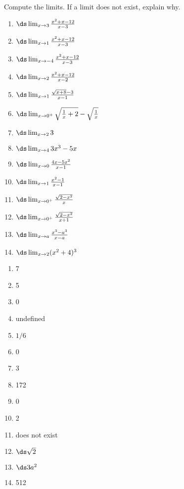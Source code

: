 \begin{enumialphparenastyle}

\begin{ex}
Compute the limits. If a limit does not exist, explain why.
\begin{multicols}{2}
\begin{enumerate}
	\item	$\ds \lim_{x\to 3}{x^2+x-12\over x-3}$
	\item	$\ds \lim_{x\to 1}{x^2+x-12\over x-3}$
	\item	$\ds \lim_{x\to -4}{x^2+x-12\over x-3}$
	\item	$\ds \lim_{x\to 2} {x^2+x-12\over x-2}$
	\item	$\ds \lim_{x\to 1} {\sqrt{x+8}-3\over x-1}$
	\item	$\ds \lim_{x\to 0^+} \sqrt{{1\over x}+2} - \sqrt{1\over x}$
	\item	$\ds\lim _{x\to 2} 3$
	\item	$\ds\lim _{x\to 4 } 3x^3 - 5x $
	\item	$\ds \lim _{x\to 0 } {4x - 5x^2\over x-1}$
	\item	$\ds\lim _{x\to 1 } {x^2 -1 \over x-1 }$
	\item	$\ds\lim _{x\to 0^ + } {\sqrt{2-x^2 }\over x}$
	\item	$\ds\lim _{x\to 0^ + } {\sqrt{2-x^2}\over x+1}$
	\item	$\ds\lim _{x\to a } {x^3 -a^3\over x-a}$
	\item	$\ds\lim _{x\to 2 } (x^2 +4)^3$
\end{enumerate}
\end{multicols}
\begin{sol}
\begin{multicols}{2}
\begin{enumerate}
	\item	7
	\item	5
	\item	0
	\item	undefined
	\item	$1/6$
	\item	0
	\item	3
	\item	172
	\item	0
	\item	2
	\item	does not exist
	\item	$\ds \sqrt2$
	\item	$\ds 3a^2$
	\item	512
\end{enumerate}
\end{multicols}
\end{sol}
\end{ex}


\end{enumialphparenastyle}
